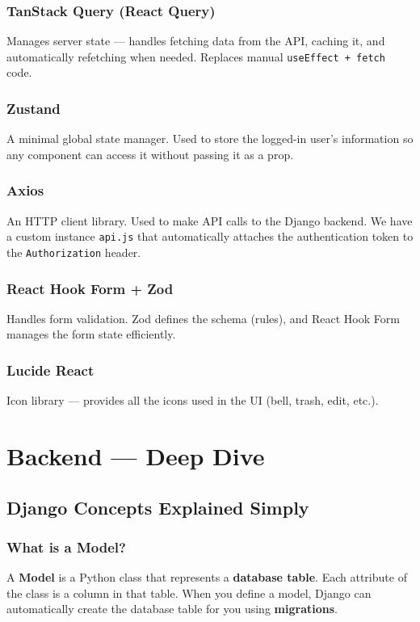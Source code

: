 \documentclass[12pt,a4paper]{article}
\begin{document}
\subsubsection{TanStack Query (React Query)}
Manages server state — handles fetching data from the API, caching it, and automatically refetching when needed. Replaces manual \texttt{useEffect + fetch} code.

\subsubsection{Zustand}
A minimal global state manager. Used to store the logged-in user's information so any component can access it without passing it as a prop.

\subsubsection{Axios}
An HTTP client library. Used to make API calls to the Django backend. We have a custom instance \texttt{api.js} that automatically attaches the authentication token to the \texttt{Authorization} header.

\subsubsection{React Hook Form + Zod}
Handles form validation. Zod defines the schema (rules), and React Hook Form manages the form state efficiently.

\subsubsection{Lucide React}
Icon library — provides all the icons used in the UI (bell, trash, edit, etc.).


\section{Backend — Deep Dive}

\subsection{Django Concepts Explained Simply}

\subsubsection{What is a Model?}
A \textbf{Model} is a Python class that represents a \textbf{database table}. Each attribute of the class is a column in that table. When you define a model, Django can automatically create the database table for you using \textbf{migrations}.
\end{document}
